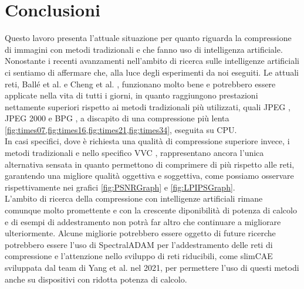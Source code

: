 \chapter{Conclusioni}
Questo lavoro presenta l’attuale situazione per quanto riguarda la compressione di immagini con metodi tradizionali e che fanno uso di intelligenza artificiale. Nonostante i recenti avanzamenti nell’ambito di ricerca sulle intelligenze artificiali ci sentiamo di affermare che, alla luce degli esperimenti da noi eseguiti. Le attuali reti, Ballé et al. \cite{minnen2018joint} e Cheng et al. \cite{cheng2020learned}, funzionano molto bene e potrebbero essere applicate nella vita di tutti i giorni, in quanto raggiungono prestazioni nettamente superiori rispetto ai metodi tradizionali più utilizzati, quali JPEG \cite{125072}, JPEG 2000 \cite{952804} e BPG \cite{BPGImageformat}, a discapito di una compressione più lenta \ref{fig:times07,fig:times16,fig:times21,fig:times34}, eseguita su CPU.\\
In casi specifici, dove è richiesta una qualità di compressione superiore invece, i metodi tradizionali e nello specifico VVC \cite{9503377}, rappresentano ancora l’unica alternativa sensata in quanto permettono di comprimere di più rispetto alle reti, garantendo una migliore qualità oggettiva e soggettiva, come possiamo osservare rispettivamente nei grafici \ref{fig:PSNRGraph} e \ref{fig:LPIPSGraph}.\\
L’ambito di ricerca della compressione con intelligenze artificiali rimane comunque molto promettente e con la crescente diponibilità di potenza di calcolo e di esempi di addestramento non potrà far altro che continuare a migliorare ulteriormente. Alcune migliorie potrebbero essere oggetto di future ricerche potrebbero essere l’uso di SpectralADAM \cite{balle2018efficient} per l’addestramento delle reti di compressione e l’attenzione nello sviluppo di reti riducibili, come slimCAE \cite{yang2021slimmable} sviluppata dal team di Yang et al. nel 2021, per permettere l’uso di questi metodi anche su dispositivi con ridotta potenza di calcolo.\\
